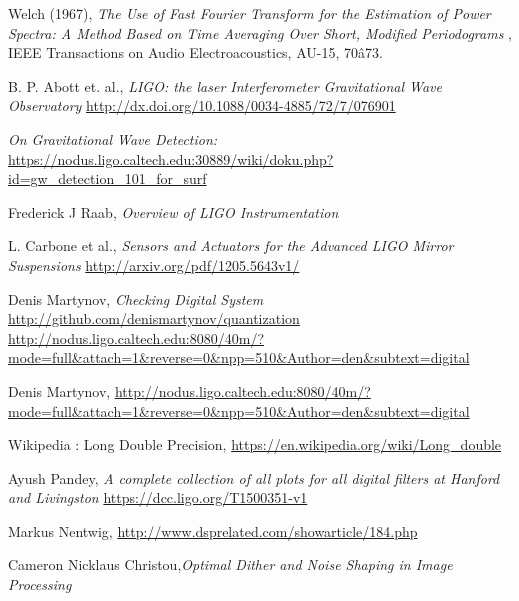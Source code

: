 \begin{thebibliography}{100}
 Welch (1967),  \emph{The Use of Fast Fourier Transform for the Estimation of Power Spectra: A Method Based on Time Averaging Over Short, Modified Periodograms} , IEEE Transactions on Audio Electroacoustics, AU-15, 70â73.

 B. P. Abott et. al.,  
				\emph{LIGO: the laser Interferometer Gravitational Wave Observatory} 							\url{http://dx.doi.org/10.1088/0034-4885/72/7/076901}

 \emph{On Gravitational Wave Detection: }
			\url{https://nodus.ligo.caltech.edu:30889/wiki/doku.php?id=gw_detection_101_for_surf}

 Frederick J Raab, \emph{Overview of LIGO Instrumentation}

 L. Carbone et al., \emph{Sensors and Actuators for the Advanced LIGO Mirror Suspensions}
									\url{http://arxiv.org/pdf/1205.5643v1/}

 Denis Martynov, \emph{Checking Digital System} \url{http://github.com/denismartynov/quantization}
\url{http://nodus.ligo.caltech.edu:8080/40m/?mode=full&attach=1&reverse=0&npp=510&Author=den&subtext=digital}  
%

 Denis Martynov, \url{http://nodus.ligo.caltech.edu:8080/40m/?mode=full&attach=1&reverse=0&npp=510&Author=den&subtext=digital}

 Wikipedia : Long Double Precision, \url{https://en.wikipedia.org/wiki/Long_double}

 Ayush Pandey, \emph{A complete collection of all plots for all digital filters at Hanford and Livingston}
\url{https://dcc.ligo.org/T1500351-v1}

 Markus Nentwig, \url{http://www.dsprelated.com/showarticle/184.php}

 Cameron Nicklaus Christou,\emph{Optimal Dither and Noise Shaping in Image Processing}


\end{thebibliography}

\newpage{\pagestyle{empty}\cleardoublepage}